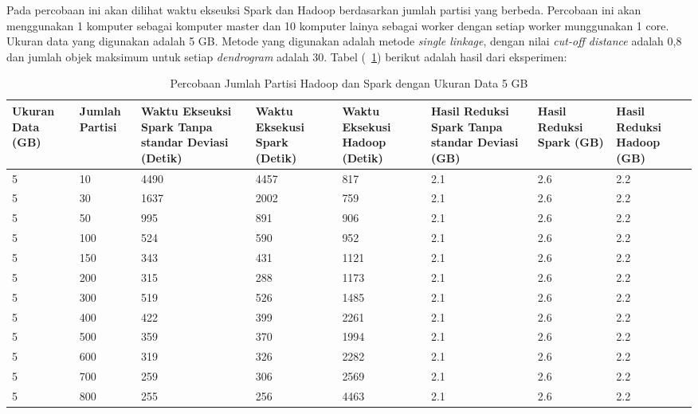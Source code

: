 

Pada percobaan ini akan dilihat waktu ekseuksi Spark dan Hadoop berdasarkan jumlah partisi yang berbeda. Percobaan ini akan menggunakan 1 komputer sebagai komputer master dan 10 komputer lainya sebagai worker dengan setiap worker munggunakan 1 core. Ukuran data yang digunakan adalah 5 GB. Metode yang digunakan adalah metode \textit{single linkage}, dengan nilai \textit{cut-off distance} adalah 0,8 dan jumlah objek maksimum untuk setiap \textit{dendrogram} adalah 30. Tabel (~\ref{tab:spark5}) berikut adalah hasil dari eksperimen:

\begin{table}[H] 
	\centering 
	\caption{Percobaan Jumlah Partisi Hadoop dan Spark dengan Ukuran Data 5 GB}
	\label{tab:spark5}
	\begin{tabular}{|p{1cm}|p{1cm}|p{2cm}|p{2cm}|p{2cm}|p{2cm}|p{2cm}|p{2cm}|}
\hline
Ukuran Data (GB) & Jumlah Partisi &  Waktu Ekseuksi Spark Tanpa standar Deviasi (Detik) & Waktu Eksekusi Spark (Detik) & Waktu Eksekusi Hadoop (Detik) & Hasil Reduksi Spark Tanpa standar Deviasi (GB) & Hasil Reduksi Spark (GB)  & Hasil Reduksi Hadoop (GB)\\ 
\hline
5  & 10 & 4490 & 4457 & 817 & 2.1 & 2.6 & 2.2\\
\hline
5  & 30 & 1637 & 2002 & 759 & 2.1 & 2.6 & 2.2\\
\hline
5  & 50 & 995 & 891 & 906 & 2.1 & 2.6 & 2.2 \\
\hline
5  & 100 & 524 & 590 & 952 & 2.1 & 2.6 & 2.2 \\
\hline
5  & 150 & 343 & 431 & 1121 & 2.1 & 2.6 & 2.2\\
\hline
5  & 200 & 315 & 288 & 1173 & 2.1 & 2.6 & 2.2\\
\hline
5  & 300 & 519 & 526 & 1485 & 2.1 & 2.6 & 2.2\\
\hline
5  & 400 & 422 & 399 & 2261 & 2.1 & 2.6 & 2.2 \\
\hline
5  & 500 & 359 & 370 & 1994 & 2.1 & 2.6 & 2.2\\
\hline
5  & 600 & 319 & 326 & 2282 & 2.1 & 2.6 & 2.2\\
\hline
5  & 700 & 259 & 306 & 2569 & 2.1 & 2.6 & 2.2\\
\hline
5  & 800 & 255 & 256 & 4463 & 2.1 & 2.6 & 2.2\\
\hline


\hline

	\end{tabular} 
\end{table}




